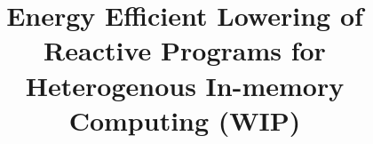 \documentclass[journal,onecolumn,12pt]{IEEEtran}
\begin{document}
\title{Energy Efficient Lowering of Reactive Programs for Heterogenous In-memory Computing (WIP)}




\maketitle

\end{document}
